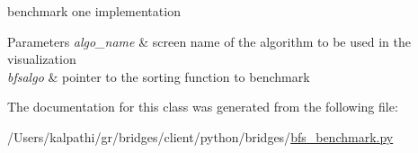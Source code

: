 benchmark one implementation 


\begin{DoxyParams}{Parameters}
{\em algo\+\_\+name} & screen name of the algorithm to be used in the visualization \\
\hline
{\em bfsalgo} & pointer to the sorting function to benchmark \\
\hline
\end{DoxyParams}


The documentation for this class was generated from the following file\+:\begin{DoxyCompactItemize}
\item 
/\+Users/kalpathi/gr/bridges/client/python/bridges/\mbox{\hyperlink{bfs__benchmark_8py}{bfs\+\_\+benchmark.\+py}}\end{DoxyCompactItemize}
